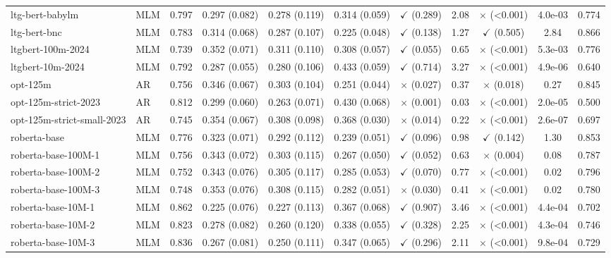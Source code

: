\begin{table}[]
\begin{adjustbox}{max width=\textwidth}
\begin{tabular}{llccccccccc}
ltg-bert-babylm & MLM & 0.797 & 0.297 (0.082) & 0.278 (0.119) & 0.314 (0.059) & $\checkmark$ (0.289) & 2.08 & $\times$ (<0.001) & 4.0e-03 & 0.774 \\
ltg-bert-bnc & MLM & 0.783 & 0.314 (0.068) & 0.287 (0.107) & 0.225 (0.048) & $\checkmark$ (0.138) & 1.27 & $\checkmark$ (0.505) & 2.84 & 0.866 \\
ltgbert-100m-2024 & MLM & 0.739 & 0.352 (0.071) & 0.311 (0.110) & 0.308 (0.057) & $\checkmark$ (0.055) & 0.65 & $\times$ (<0.001) & 5.3e-03 & 0.776 \\
ltgbert-10m-2024 & MLM & 0.792 & 0.287 (0.055) & 0.280 (0.106) & 0.433 (0.059) & $\checkmark$ (0.714) & 3.27 & $\times$ (<0.001) & 4.9e-06 & 0.640 \\
opt-125m & AR & 0.756 & 0.346 (0.067) & 0.303 (0.104) & 0.251 (0.044) & $\times$ (0.027) & 0.37 & $\times$ (0.018) & 0.27 & 0.845 \\
opt-125m-strict-2023 & AR & 0.812 & 0.299 (0.060) & 0.263 (0.071) & 0.430 (0.068) & $\times$ (0.001) & 0.03 & $\times$ (<0.001) & 2.0e-05 & 0.500 \\
opt-125m-strict-small-2023 & AR & 0.745 & 0.354 (0.067) & 0.308 (0.098) & 0.368 (0.030) & $\times$ (0.014) & 0.22 & $\times$ (<0.001) & 2.6e-07 & 0.697 \\
roberta-base & MLM & 0.776 & 0.323 (0.071) & 0.292 (0.112) & 0.239 (0.051) & $\checkmark$ (0.096) & 0.98 & $\checkmark$ (0.142) & 1.30 & 0.853 \\
roberta-base-100M-1 & MLM & 0.756 & 0.343 (0.072) & 0.303 (0.115) & 0.267 (0.050) & $\checkmark$ (0.052) & 0.63 & $\times$ (0.004) & 0.08 & 0.787 \\
roberta-base-100M-2 & MLM & 0.752 & 0.343 (0.076) & 0.305 (0.117) & 0.285 (0.053) & $\checkmark$ (0.070) & 0.77 & $\times$ (<0.001) & 0.02 & 0.796 \\
roberta-base-100M-3 & MLM & 0.748 & 0.353 (0.076) & 0.308 (0.115) & 0.282 (0.051) & $\times$ (0.030) & 0.41 & $\times$ (<0.001) & 0.02 & 0.780 \\
roberta-base-10M-1 & MLM & 0.862 & 0.225 (0.076) & 0.227 (0.113) & 0.367 (0.068) & $\checkmark$ (0.907) & 3.46 & $\times$ (<0.001) & 4.4e-04 & 0.702 \\
roberta-base-10M-2 & MLM & 0.823 & 0.278 (0.082) & 0.260 (0.120) & 0.338 (0.055) & $\checkmark$ (0.328) & 2.25 & $\times$ (<0.001) & 4.3e-04 & 0.746 \\
roberta-base-10M-3 & MLM & 0.836 & 0.267 (0.081) & 0.250 (0.111) & 0.347 (0.065) & $\checkmark$ (0.296) & 2.11 & $\times$ (<0.001) & 9.8e-04 & 0.729 \\

\end{tabular}
\end{adjustbox}
\end{table}
